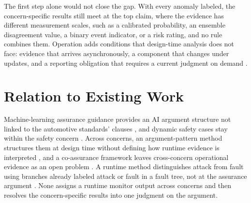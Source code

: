 \documentclass[conference,a4paper]{IEEEtran}
\begin{document}
	The first step alone would not close the gap. With every anomaly labeled, the concern-specific results still meet at the top claim, where the evidence has different measurement scales, such as a calibrated probability, an ensemble disagreement value, a binary event indicator, or a risk rating, and no rule combines them. Operation adds conditions that design-time analysis does not face: evidence that arrives asynchronously, a component that changes under updates, and a reporting obligation that requires a current judgment on demand \cite{UNECE2026}.
	
	\section{Relation to Existing Work}
	Machine-learning assurance guidance provides an AI argument structure not linked to the automotive standards' clauses \cite{Hawkins2021}, and dynamic safety cases stay within the safety concern \cite{Denney2015}. Across concerns, an argument-pattern method structures them at design time without defining how runtime evidence is interpreted \cite{Warg2019}, and a co-assurance framework leaves cross-concern operational evidence as an open problem \cite{JohnsonKelly2018}. A runtime method distinguishes attack from fault using branches already labeled attack or fault in a fault tree, not at the assurance argument \cite{Cardoso2022}. None assigns a runtime monitor output across concerns and then resolves the concern-specific results into one judgment on the argument.
	
\end{document}
